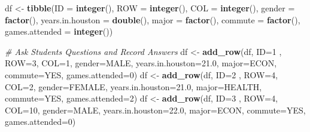 \documentclass[
]{book}
\newenvironment{Shaded}{\begin{snugshade}}{\end{snugshade}}
\newcommand{\CommentTok}[1]{\textcolor[rgb]{0.56,0.35,0.01}{\textit{#1}}}
\newcommand{\DataTypeTok}[1]{\textcolor[rgb]{0.13,0.29,0.53}{#1}}
\newcommand{\DecValTok}[1]{\textcolor[rgb]{0.00,0.00,0.81}{#1}}
\newcommand{\FloatTok}[1]{\textcolor[rgb]{0.00,0.00,0.81}{#1}}
\newcommand{\KeywordTok}[1]{\textcolor[rgb]{0.13,0.29,0.53}{\textbf{#1}}}
\newcommand{\NormalTok}[1]{#1}
\newcommand{\StringTok}[1]{\textcolor[rgb]{0.31,0.60,0.02}{#1}}
\begin{document}
\begin{Shaded}
\begin{Highlighting}[]
\NormalTok{df \textless{}{-}}\StringTok{ }\KeywordTok{tibble}\NormalTok{(}\DataTypeTok{ID =} \KeywordTok{integer}\NormalTok{(), }\DataTypeTok{ROW =} \KeywordTok{integer}\NormalTok{(), }\DataTypeTok{COL =} \KeywordTok{integer}\NormalTok{(),}
             \DataTypeTok{gender =} \KeywordTok{factor}\NormalTok{(),}
             \DataTypeTok{years.in.houston =} \KeywordTok{double}\NormalTok{(),}
             \DataTypeTok{major =} \KeywordTok{factor}\NormalTok{(),}
             \DataTypeTok{commute =} \KeywordTok{factor}\NormalTok{(),}
             \DataTypeTok{games.attended =} \KeywordTok{integer}\NormalTok{())}


\CommentTok{\# Ask Students Questions and Record Answers}
\NormalTok{df \textless{}{-}}\StringTok{ }\KeywordTok{add\_row}\NormalTok{(df, }\DataTypeTok{ID=}\DecValTok{1}\NormalTok{ , }\DataTypeTok{ROW=}\DecValTok{3}\NormalTok{, }\DataTypeTok{COL=}\DecValTok{1}\NormalTok{,  }\DataTypeTok{gender=}\StringTok{\textquotesingle{}MALE\textquotesingle{}}\NormalTok{,   }\DataTypeTok{years.in.houston=}\FloatTok{21.0}\NormalTok{,}
              \DataTypeTok{major=}\StringTok{\textquotesingle{}ECON\textquotesingle{}}\NormalTok{, }\DataTypeTok{commute=}\StringTok{\textquotesingle{}YES\textquotesingle{}}\NormalTok{, }\DataTypeTok{games.attended=}\DecValTok{0}\NormalTok{)}
\NormalTok{df \textless{}{-}}\StringTok{ }\KeywordTok{add\_row}\NormalTok{(df, }\DataTypeTok{ID=}\DecValTok{2}\NormalTok{ , }\DataTypeTok{ROW=}\DecValTok{4}\NormalTok{, }\DataTypeTok{COL=}\DecValTok{2}\NormalTok{,  }\DataTypeTok{gender=}\StringTok{\textquotesingle{}FEMALE\textquotesingle{}}\NormalTok{, }\DataTypeTok{years.in.houston=}\FloatTok{21.0}\NormalTok{,}
              \DataTypeTok{major=}\StringTok{\textquotesingle{}HEALTH\textquotesingle{}}\NormalTok{, }\DataTypeTok{commute=}\StringTok{\textquotesingle{}YES\textquotesingle{}}\NormalTok{, }\DataTypeTok{games.attended=}\DecValTok{2}\NormalTok{)}
\NormalTok{df \textless{}{-}}\StringTok{ }\KeywordTok{add\_row}\NormalTok{(df, }\DataTypeTok{ID=}\DecValTok{3}\NormalTok{ , }\DataTypeTok{ROW=}\DecValTok{4}\NormalTok{, }\DataTypeTok{COL=}\DecValTok{10}\NormalTok{, }\DataTypeTok{gender=}\StringTok{\textquotesingle{}MALE\textquotesingle{}}\NormalTok{,   }\DataTypeTok{years.in.houston=}\FloatTok{22.0}\NormalTok{,}
              \DataTypeTok{major=}\StringTok{\textquotesingle{}ECON\textquotesingle{}}\NormalTok{, }\DataTypeTok{commute=}\StringTok{\textquotesingle{}YES\textquotesingle{}}\NormalTok{, }\DataTypeTok{games.attended=}\DecValTok{0}\NormalTok{)}

\end{Highlighting}
\end{Shaded}
\end{document}
